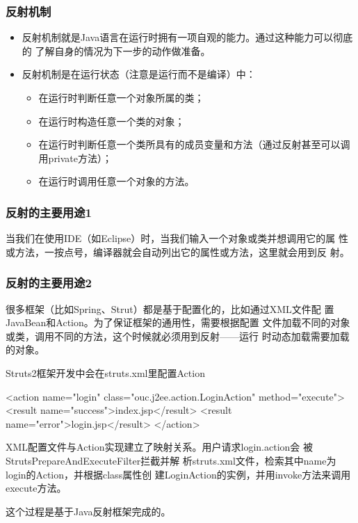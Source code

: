 \begin{frame}[fragile] %
\frametitle{反射机制}

\begin{itemize}
\item 反射机制就是Java语言在运行时拥有一项自观的能力。通过这种能力可以彻底的
了解自身的情况为下一步的动作做准备。
\item 反射机制是在运行状态（注意是运行而不是编译）中：
  \begin{itemize}\kai
  \item 在运行时判断任意一个对象所属的类；
  \item 在运行时构造任意一个类的对象；
  \item 在运行时判断任意一个类所具有的成员变量和方法（通过反射甚至可以调用private方法）；
  \item 在运行时调用任意一个对象的方法。
  \end{itemize}

\end{itemize}
\end{frame}


\begin{frame}[fragile] %
  \frametitle{反射的主要用途1}


  当我们在使用IDE（如Eclipse）时，当我们输入一个对象或类并想调用它的属
  性或方法，一按点号，编译器就会自动列出它的属性或方法，这里就会用到反
  射。

\end{frame}

\begin{frame}[fragile] %
  \frametitle{反射的主要用途2}


  很多框架（比如Spring、Strut）都是基于配置化的，比如通过XML文件配
  置JavaBean和Action。为了保证框架的通用性，需要根据配置
  文件加载不同的对象或类，调用不同的方法，这个时候就必须用到反射——{\hei\Red 运行
    时动态加载需要加载的对象}。

   {\kai Struts2框架开发中会在struts.xml里配置Action}

  \begin{xmlCode}
    <action name="login" class="ouc.j2ee.action.LoginAction" method="execute">
      <result name="success">index.jsp</result>
      <result name="error">login.jsp</result>
    </action>
  \end{xmlCode}
  
  XML配置文件与Action实现建立了映射关系。用户请求login.action会
  被StrutsPrepareAndExecuteFilter拦截并解
  析struts.xml文件，检索其中name为login的Action，并根据class属性创
  建LoginAction的实例，并用invoke方法来调用execute方法。

  {\Red 这个过程是基于Java反射框架完成的}。

\end{frame}

